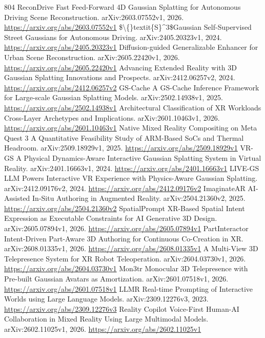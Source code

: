 \documentclass[11pt]{article}
\begin{document}
\begin{thebibliography}{804}
 ReconDrive Fast Feed-Forward 4D Gaussian Splatting for Autonomous Driving Scene Reconstruction. arXiv:2603.07552v1, 2026. \url{https://arxiv.org/abs/2603.07552v1}
 \$\textbackslash\{\}textit\{S\}\textasciicircum{}3\$Gaussian Self-Supervised Street Gaussians for Autonomous Driving. arXiv:2405.20323v1, 2024. \url{https://arxiv.org/abs/2405.20323v1}
 Diffusion-guided Generalizable Enhancer for Urban Scene Reconstruction. arXiv:2605.22420v1, 2026. \url{https://arxiv.org/abs/2605.22420v1}
 Advancing Extended Reality with 3D Gaussian Splatting Innovations and Prospects. arXiv:2412.06257v2, 2024. \url{https://arxiv.org/abs/2412.06257v2}
 GS-Cache A GS-Cache Inference Framework for Large-scale Gaussian Splatting Models. arXiv:2502.14938v1, 2025. \url{https://arxiv.org/abs/2502.14938v1}
 Architectural Classification of XR Workloads Cross-Layer Archetypes and Implications. arXiv:2601.10463v1, 2026. \url{https://arxiv.org/abs/2601.10463v1}
 Native Mixed Reality Compositing on Meta Quest 3 A Quantitative Feasibility Study of ARM-Based SoCs and Thermal Headroom. arXiv:2509.18929v1, 2025. \url{https://arxiv.org/abs/2509.18929v1}
 VR-GS A Physical Dynamics-Aware Interactive Gaussian Splatting System in Virtual Reality. arXiv:2401.16663v1, 2024. \url{https://arxiv.org/abs/2401.16663v1}
 LIVE-GS LLM Powers Interactive VR Experience with Physics-Aware Gaussian Splatting. arXiv:2412.09176v2, 2024. \url{https://arxiv.org/abs/2412.09176v2}
 ImaginateAR AI-Assisted In-Situ Authoring in Augmented Reality. arXiv:2504.21360v2, 2025. \url{https://arxiv.org/abs/2504.21360v2}
 SpatialPrompt XR-Based Spatial Intent Expression as Executable Constraints for AI Generative 3D Design. arXiv:2605.07894v1, 2026. \url{https://arxiv.org/abs/2605.07894v1}
 PartInteractor Intent-Driven Part-Aware 3D Authoring for Continuous Co-Creation in XR. arXiv:2608.01335v1, 2026. \url{https://arxiv.org/abs/2608.01335v1}
 A Multi-View 3D Telepresence System for XR Robot Teleoperation. arXiv:2604.03730v1, 2026. \url{https://arxiv.org/abs/2604.03730v1}
 Mon3tr Monocular 3D Telepresence with Pre-built Gaussian Avatars as Amortization. arXiv:2601.07518v1, 2026. \url{https://arxiv.org/abs/2601.07518v1}
 LLMR Real-time Prompting of Interactive Worlds using Large Language Models. arXiv:2309.12276v3, 2023. \url{https://arxiv.org/abs/2309.12276v3}
 Reality Copilot Voice-First Human-AI Collaboration in Mixed Reality Using Large Multimodal Models. arXiv:2602.11025v1, 2026. \url{https://arxiv.org/abs/2602.11025v1}

\end{thebibliography}
\end{document}
